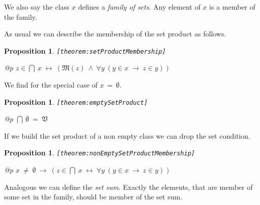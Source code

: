 \documentclass[a4paper,german,10pt,twoside]{book}
\newtheorem{prop}[thm]{Proposition}
\theoremstyle{definition}
\theoremstyle{remark}
\begin{document}
\par
We also say the class $x$ defines a \emph{family of sets}. 
Any element of $x$ is a member of the family.


\par
As usual we can describe the membership of the set product as follows.

\begin{prop}
\label{theorem:setProductMembership} \hypertarget{theorem:setProductMembership}{}
{\tt \tiny [\verb]theorem:setProductMembership]]}
\mbox{}
\begin{longtable}{{@{\extracolsep{\fill}}p{\linewidth}}}
\centering $z \in \bigcap \ x\ \leftrightarrow\ (\mathfrak{M}(z)\ \land\ \forall y\ (y \in x\ \rightarrow\ z \in y))$
\end{longtable}

\end{prop}


\par
We find for the special case of $x\,=\,\emptyset$.

\begin{prop}
\label{theorem:emptySetProduct} \hypertarget{theorem:emptySetProduct}{}
{\tt \tiny [\verb]theorem:emptySetProduct]]}
\mbox{}
\begin{longtable}{{@{\extracolsep{\fill}}p{\linewidth}}}
\centering $\bigcap \ \emptyset \ = \ \mathfrak{V}$
\end{longtable}

\end{prop}


\par
If we build the set product of a non empty class we can
drop the set condition.

\begin{prop}
\label{theorem:nonEmptySetProductMembership} \hypertarget{theorem:nonEmptySetProductMembership}{}
{\tt \tiny [\verb]theorem:nonEmptySetProductMembership]]}
\mbox{}
\begin{longtable}{{@{\extracolsep{\fill}}p{\linewidth}}}
\centering $x \ \neq \ \emptyset\ \rightarrow\ (z \in \bigcap \ x\ \leftrightarrow\ \forall y\ (y \in x\ \rightarrow\ z \in y))$
\end{longtable}

\end{prop}


\par
Analogous we  can define the \emph{set sum}.
Exactly the elements, that are member of some set in the family, should be member of the set sum.
\end{document}
